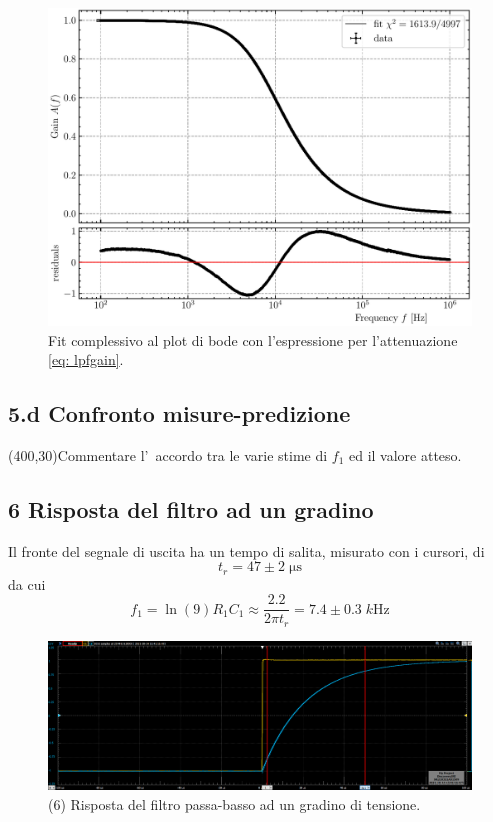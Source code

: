 \documentclass[10pt,a4paper]{article}
\begin{document}
\begin{figure}[htbp]
\centering
\includegraphics[scale=0.7]{lpfbodefit}
\caption{Fit complessivo al plot di bode con l'espressione per l'attenuazione
\eqref{eq: lpfgain}.\label{fig: lpfbodefit}}
\end{figure}

\subsection*{5.d Confronto misure-predizione}
\vspace{0.5cm}
\framebox(400,30){Commentare l'~accordo tra le varie stime di $f_1$ ed il 
valore atteso.}

\subsection*{6 Risposta del filtro ad un gradino}
Il fronte del segnale di uscita ha un tempo di salita, misurato con i cursori, 
di 
\[
t_r = 47 \pm 2 \; \si{\micro\second}
\]
da cui 
\[
f_1 = \ln(9) R_1 C_1 \approx \frac{2.2}{2\pi t_r} = 7.4 \pm 0.3 \; \si{k\Hz}
\]
\begin{figure}[htb]
\centering
\includegraphics[scale=0.35]{rc2k10nF_rise}
\caption{(6) Risposta del filtro passa-basso ad un gradino di tensione.}
\end{figure}
\end{document}
